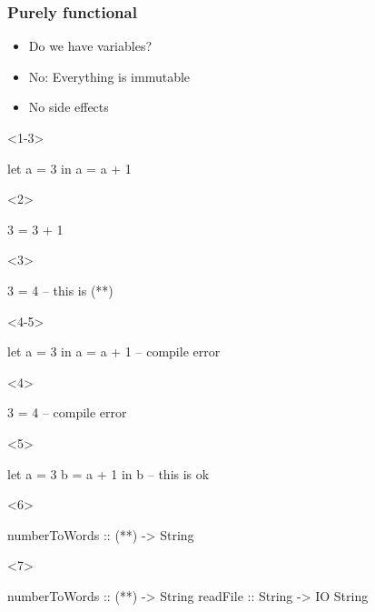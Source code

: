 \documentclass[17pt]{beamer}
\renewcommand{\(}[1]{\begin{columns}[#1]}
\renewcommand{\)}{\end{columns}}
\newcommand{\<}[1]{\begin{column}{#1}}
\renewcommand{\>}{\end{column}}
\begin{document}
\begin{frame}[fragile]
  \frametitle{Purely functional}
  \begin{minipage}[t][.2\textheight]{\textwidth}
  \begin{itemize}
    \item<1-> Do we have variables?
    \item<4-> {\color{google-r}No}: Everything is immutable
    \item<6-> No side effects
  \end{itemize}
  \end{minipage}
  \begin{minipage}[c][.5\textheight]{\textwidth}
  \begin{center}
    \begin{onlyenv}<1-3>
      \begin{code}
let a = 3
in  a = a + 1
      \end{code}
    \end{onlyenv}
    \begin{onlyenv}<2>
      \begin{code}[eval]
3 = 3 + 1
      \end{code}
    \end{onlyenv}
    \begin{onlyenv}<3>
      \begin{code}[eval]
3 = 4 -- this is (*\color{google-r}{bad}*)
      \end{code}
    \end{onlyenv}
    \begin{onlyenv}<4-5>
      \begin{code}
let a = 3
in  a = a + 1 -- compile error
      \end{code}
    \end{onlyenv}
    \begin{onlyenv}<4>
      \begin{code}[eval]
3 = 4 -- compile error
      \end{code}
    \end{onlyenv}
    \begin{onlyenv}<5>
      \begin{code}
let a = 3
    b = a + 1
in b -- this is ok
      \end{code}
    \end{onlyenv}
    \begin{onlyenv}<6>
      \begin{code}
numberToWords :: (**) -> String
      \end{code}
    \end{onlyenv}
    \begin{onlyenv}<7>
      \begin{code}
numberToWords :: (**) -> String
readFile :: String -> IO String
      \end{code}
    \end{onlyenv}
  \end{center}
  \end{minipage}
\end{frame}
\end{document}
